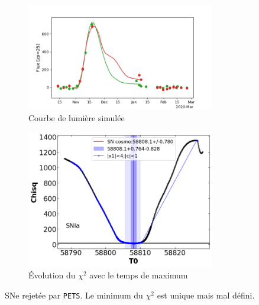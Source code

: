 \documentclass{book}
\def\pets{\texttt{PETS}\xspace}
\begin{document}
\begin{figure}
	\begin{subfigure}{0.45\textwidth}
		\centering
		\includegraphics[width=0.9\textwidth]{figures/10_lc_truth.png}
		\caption{Courbe de lumière simulée}
	\end{subfigure}
	\hfill
	\begin{subfigure}{0.45\textwidth}
		\centering
		\includegraphics[width=0.9\textwidth]{figures/10_Tmaxgrid.png}
		\caption{Évolution du $\chi^2$ avec le temps de maximum}
	\end{subfigure}
	\caption{SNe rejetée par \pets. Le minimum du $\chi^2$ est unique mais mal défini.}
	\label{fig:pets_bad}
\end{figure}
\end{document}
